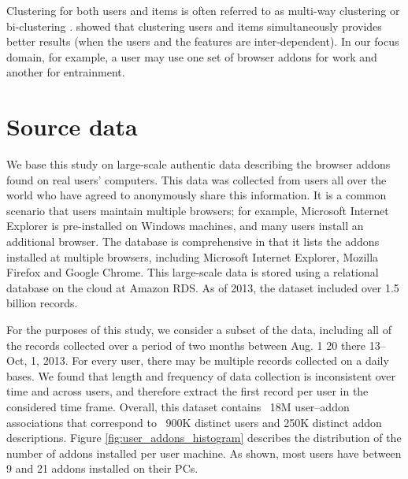 \documentclass[ijoc,nonblindrev]{informs3} %
\numberwithin{equation}{subsection}
\begin{document}
Clustering for both users and items is often referred to as multi-way clustering \citep{bekkerman05} or bi-clustering \citep{zhu2009analyzing}.
\cite{bekkerman05} showed that clustering users and items
simultaneously provides better results (when the users and the
features are inter-dependent). In our focus domain, for example, a user may use one set of browser addons for work and another for
entrainment.
\fi

\section{Source data}
\label{sec:datasets}

We base this study on large-scale authentic data describing the browser addons found on real users' computers. This data was collected from users all over the world who have agreed to anonymously share this information. It is a common scenario that users maintain multiple browsers; for example, Microsoft Internet Explorer is pre-installed on Windows machines, and many users install an additional browser. The database is comprehensive in that it lists the addons installed at multiple browsers, including Microsoft Internet Explorer, Mozilla Firefox and Google Chrome. This large-scale data is stored using a relational database on the cloud at Amazon RDS. As of 2013, the dataset included over 1.5 billion records. 

For the purposes of this study, we consider a subset of the data, including all of the records collected over a period of two months between Aug. 1 20 there 13--Oct, 1, 2013. For every user, there may be multiple records collected on a daily bases. We found that length and frequency of data collection is inconsistent over time and across users, and therefore extract the first record per user in the considered time frame. Overall, this dataset contains ~18M user--addon associations that correspond to ~900K distinct users and 250K distinct addon descriptions. Figure \ref{fig:user_addons_histogram} describes the distribution of the number of addons installed per user machine. As shown,  most users have between 9 and 21 addons installed on their PCs.
\end{document}
